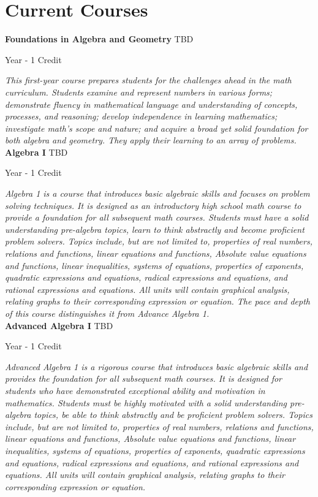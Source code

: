 \section{Current Courses}

\noindent\textbf{Foundations in Algebra and Geometry} \hfill TBD

\noindent Year - 1 Credit

\vspace{1mm}\emph{This first-year course prepares students for the challenges ahead in the math curriculum. Students examine and represent numbers in various forms; demonstrate fluency in mathematical language and understanding of concepts, processes, and reasoning; develop independence in learning mathematics; investigate math's scope and nature; and acquire a broad yet solid foundation for both algebra and geometry. They apply their learning to an array of problems.}\\


\noindent\textbf{Algebra I} \hfill TBD

\noindent Year - 1 Credit

\vspace{1mm}\emph{Algebra 1 is a course that introduces basic algebraic skills and focuses on problem solving techniques. It is designed as an introductory high school math course to provide a foundation for all subsequent math courses. Students must have a solid understanding pre-algebra topics, learn to think abstractly and become proficient problem solvers. Topics include, but are not limited to, properties of real numbers, relations and functions, linear equations and functions, Absolute value equations and functions, linear inequalities, systems of equations, properties of exponents, quadratic expressions and equations, radical expressions and equations, and rational expressions and equations. All units will contain graphical analysis, relating graphs to their corresponding expression or equation. The pace and depth of this course distinguishes it from Advance Algebra 1.}\\


\noindent\textbf{Advanced Algebra I} \hfill TBD

\noindent Year - 1 Credit

\vspace{1mm}\emph{Advanced Algebra 1 is a rigorous course that introduces basic algebraic skills and provides the foundation for all subsequent math courses. It is designed for students who have demonstrated exceptional ability and motivation in mathematics. Students must be highly motivated with a solid understanding pre-algebra topics, be able to think abstractly and be proficient problem solvers. Topics include, but are not limited to, properties of real numbers, relations and functions, linear equations and functions, Absolute value equations and functions, linear inequalities, systems of equations, properties of exponents, quadratic expressions and equations, radical expressions and equations, and rational expressions and equations. All units will contain graphical analysis, relating graphs to their corresponding expression or equation.}\\


